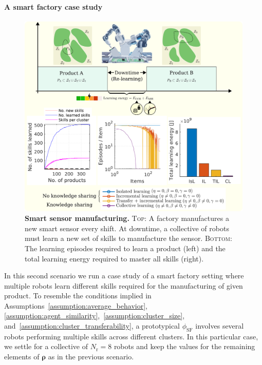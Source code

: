 \documentclass[12pt]{article}
\begin{document}
\paragraph*{A smart factory case study}
\begin{figure}[t!]
	\centering
	\hspace*{\fill}
	\includegraphics[width=16cm]{smart_factory_case_study.png}
	\hspace*{\fill}
	\caption[] {\label{fig:smart_factory_case_study} \textbf{Smart sensor manufacturing.} {\textsc{Top}: A factory manufactures a new smart sensor every shift. At downtime, a collective of robots must learn a new set of skills to manufacture the sensor. \textsc{Bottom}: The learning episodes required to learn a product (left) and the total learning energy required to master all skills (right).}}
\end{figure}

In this second scenario we run a case study of a smart factory setting where multiple robots learn different skills required for the manufacturing of given product. To resemble the conditions implied in Assumptions~\ref{assumption:average_behavior}, \ref{assumption:agent_similarity},~\ref{assumption:cluster_size}, and~\ref{assumption:cluster_transferability}, a prototypical $\phi_\text{SF}$ involves several robots performing multiple skills across different clusters. In this particular case, we settle for a collective of $N_\mathrm{r} = 8$ robots and keep the values for the remaining elements of $ \bm{\rho} $ as in the previous scenario. 
\end{document}
